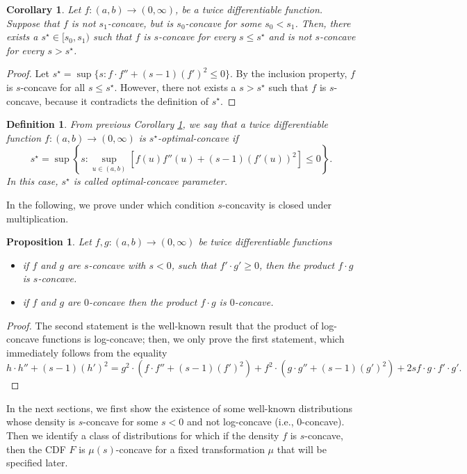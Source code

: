 \documentclass{article} %
\newtheorem{corollary}[theorem]{Corollary}
\newtheorem{definition}[theorem]{Definition}
\newtheorem{proposition}[theorem]{Proposition}
\begin{document}
\begin{corollary}\label{cor:max_lambda}
Let $f:(a,b)\rightarrow (0,\infty)$, be a twice differentiable function. Suppose that $f$ is not $s_1$-concave, but is $s_0$-concave for some $s_0<s_1$. Then, there exists a $s^{\star}\in[s_0,s_1)$ such that $f$ is $s$-concave for every $s \leq s^{\star}$ and is not $s$-concave for every $s > s^{\star}$.
\end{corollary}


\begin{proof}
Let $s^{\star} = \sup \{s: f \cdot f'' + (s - 1) (f')^2 \leq 0 \}$. By the inclusion property, $f$ is $s$-concave for all $s\leq s^{\star}$. However, there not exists a $s>s^{\star}$ such that $f$ is $s$-concave, because it contradicts the definition of $s^{\star}$.
\end{proof}

\begin{definition}\label{def:optimal-concave}
From previous Corollary \ref{cor:max_lambda}, we say that a twice differentiable function $f:(a,b) \rightarrow (0,\infty)$ is \textit{$s^{\star}$-optimal-concave} if 
$$
s^{\star} = \sup \left\{s: \sup_{u \in (a,b)}[f(u) f''(u) + (s - 1) (f'(u))^2 ]\leq 0 \right\}.
$$
In this case, $s^{\star}$ is called \textit{optimal-concave} parameter.
\end{definition}
In the following, we prove under which condition $s$-concavity is closed under multiplication.
\begin{proposition}\label{prop:product-alpha-concavity}
Let $f,g:(a,b)\rightarrow (0,\infty)$ be twice differentiable functions 
\begin{itemize}
\item if $f$ and $g$ are $s$-concave with $s < 0$, such that $f'\cdot g'\geq 0$, then the product $f\cdot g$ is $s$-concave.
\item if $f$ and $g$ are $0$-concave then the product $f\cdot g$ is $0$-concave.
\end{itemize}
\end{proposition}
\begin{proof}
The second statement is the well-known result that the product of log-concave functions is log-concave; then, we only prove the first statement, which immediately follows from the equality
$$
h\cdot h'' + (s -1) (h')^2 = g^2 \cdot (f\cdot f''+ (s -1) (f')^2) + f^2 \cdot (g\cdot g''+ (s -1) (g')^2) + 2 s f \cdot g \cdot f' \cdot g'.
$$
\end{proof}
\noindent
In the next sections, we first show the existence of some well-known distributions whose density is $s$-concave for some $s<0$ and not log-concave (i.e., $0$-concave). Then we identify a class of distributions for which if the density $f$ is $s$-concave, then the CDF $F$ is $\mu(s)$-concave for a fixed transformation $\mu$ that will be specified later. 
\end{document}
